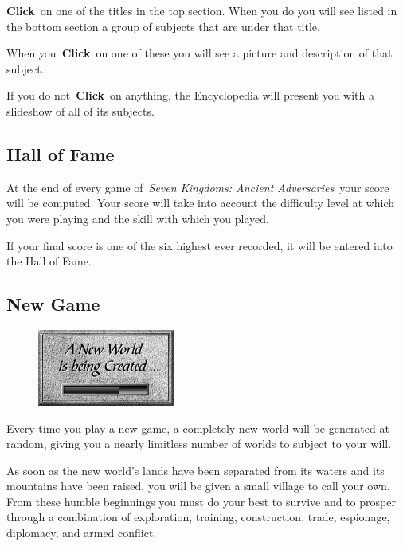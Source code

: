 \textbf{Click} on one of the titles in the top section. When you do you will see listed in the bottom section a group of subjects that are under that title.

When you \textbf{Click} on one of these you will see a picture and description of that subject.

If you do not \textbf{Click} on anything, the Encyclopedia will present you with a slideshow of all of its subjects.

\subsection{Hall of Fame}

At the end of every game of \textit{Seven Kingdoms: Ancient Adversaries} your score will be computed. Your score will take into account the difficulty level at which you were playing and the skill with which you played.

If your final score is one of the six highest ever recorded, it will be entered into the Hall of Fame.

\subsection{New Game}

\begin{figure}
	\begin{center}
		\vspace{-20pt}
		\includegraphics[width=0.4\textwidth]{Inewworld}
	\end{center}
\vspace{-20pt}
\end{figure}

Every time you play a new game, a completely new world will be generated at random, giving you a nearly limitless number of worlds to subject to your will.

As soon as the new world’s lands have been separated from its waters and its mountains have been raised, you will be given a small village to call your own. From these humble beginnings you must do your best to survive and to prosper through a combination of exploration, training, construction, trade, espionage, diplomacy, and armed conflict.

